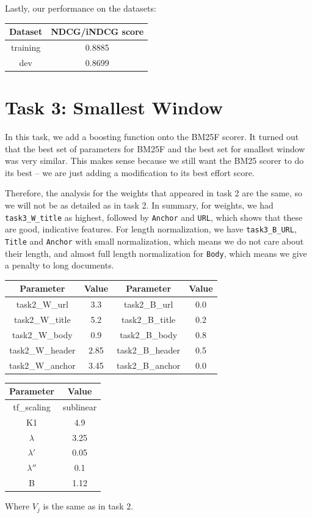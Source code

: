 \documentclass[10pt,twocolumn]{article}
\begin{document}
Lastly, our performance on the datasets:
\begin{table}[H]
\centering
\begin{tabular}{|c|c|}
\hline
Dataset & NDCG/iNDCG score \\\hline
training & 0.8885\\\hline
dev & 0.8699\\\hline
\end{tabular}
\end{table}
\section*{Task 3: Smallest Window}
In this task, we add a boosting function onto the BM25F scorer. It turned out that the best set of parameters for BM25F and the best set for smallest window was very similar. This makes sense because we still want the BM25 scorer to do its best -- we are just adding a modification to its best effort score. 

Therefore, the analysis for the weights that appeared in task 2 are the same, so we will not be as detailed as in task 2. In summary, for weights, we had \texttt{task3\_W\_title} as highest, followed by \texttt{Anchor} and \texttt{URL}, which shows that these are good, indicative features. For length normalization, we have \texttt{task3\_B\_URL}, \texttt{Title} and \texttt{Anchor} with small normalization, which means we do not care about their length, and almost full length normalization for \texttt{Body}, which means we give a penalty to long documents.
\begin{table}[H]
\centering
\begin{tabular}{|c|c|c|c|}
\hline
Parameter & Value & Parameter & Value\\\hline
task2\_W\_url & 3.3 & task2\_B\_url & 0.0\\\hline
task2\_W\_title & 5.2 & task2\_B\_title & 0.2\\\hline
task2\_W\_body & 0.9 & task2\_B\_body & 0.8\\\hline
task2\_W\_header & 2.85 & task2\_B\_header & 0.5 \\\hline
task2\_W\_anchor & 3.45 & task2\_B\_anchor & 0.0\\\hline
\end{tabular}
\end{table}
\begin{table}[H]
\centering
\begin{tabular}{|c|c|}
\hline
Parameter & Value\\\hline
tf\_scaling & sublinear\\\hline
K1 & 4.9\\\hline
$\lambda$ & 3.25\\\hline
$\lambda'$ & 0.05\\\hline
$\lambda''$ & 0.1\\\hline
B & 1.12\\\hline
\end{tabular}
\end{table}
Where $V_j$ is the same as in task 2.
\end{document}
